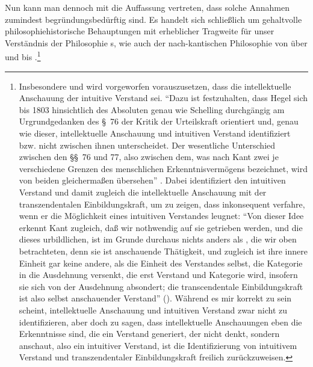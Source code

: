 Nun kann man dennoch mit
die Auffassung vertreten, dass solche Annahmen zumindest
begründungsbedürftig sind. Es handelt sich schließlich um gehaltvolle
philosophiehistorische Behauptungen mit erheblicher Tragweite für unser
Verständnis der Philosophie s, wie auch der
nach-kantischen Philosophie von  über
 und
 bis
.\footnote{Insbesondere
 und
 wird vorgeworfen
vorauszusetzen, dass die intellektuelle Anschauung der
intuitive Verstand sei. \enquote{Dazu ist festzuhalten, dass Hegel sich bis 1803
hinsichtlich des Absoluten genau wie Schelling durchgängig am Urgrundgedanken
des \S~76 der Kritik der Urteilskraft orientiert und, genau wie dieser,
intellektuelle Anschauung und intuitiven Verstand identifiziert bzw.
nicht zwischen ihnen unterscheidet. Der wesentliche Unterschied zwischen den
\S\S~76 und 77, also zwischen dem, was nach Kant zwei je verschiedene Grenzen
des menschlichen Erkenntnisvermögens bezeichnet, wird von beiden gleichermaßen
übersehen}
\parencite[][325]{Foerster:DieBedeutungvonSS7677deremphKritikderUrteilskraftfuerdieEntwicklungdernachkantischenPhilosophieTeil22002}.
Dabei identifiziert 
den intuitiven Verstand und damit zugleich die intellektuelle Anschauung
mit der transzendentalen Einbildungskraft, um zu zeigen, dass
 inkonsequent verfahre, wenn er die Möglichkeit eines
intuitiven Verstandes leugnet: \enquote{Von dieser Idee erkennt Kant zugleich,
daß wir nothwendig auf sie getrieben werden, und die  dieses
urbildlichen,  ist im Grunde
durchaus nichts anders als , die wir oben betrachteten, denn sie ist
anschauende Thätigkeit, und zugleich ist ihre innere Einheit gar keine andere,
als die Einheit des Verstandes selbst, die Kategorie in die Ausdehnung versenkt, die
erst Verstand und Kategorie wird, insofern sie sich von der Ausdehnung
absondert; die transcendentale Einbildungskraft ist also selbst anschauender
Verstand}
\mkbibparens{\cite[][IV: 341.1--8]{Hegel:GesammelteWerke}}. Während es mir korrekt zu sein
scheint, intellektuelle Anschauung und intuitiven Verstand zwar nicht zu
identifizieren, aber doch zu sagen, dass intellektuelle Anschauungen eben die
Erkenntnisse sind, die ein Verstand generiert, der nicht denkt, sondern
anschaut, also ein intuitiver Verstand, ist die Identifizierung von intuitivem
Verstand und transzendentaler Einbildungskraft freilich zurückzuweisen.}
